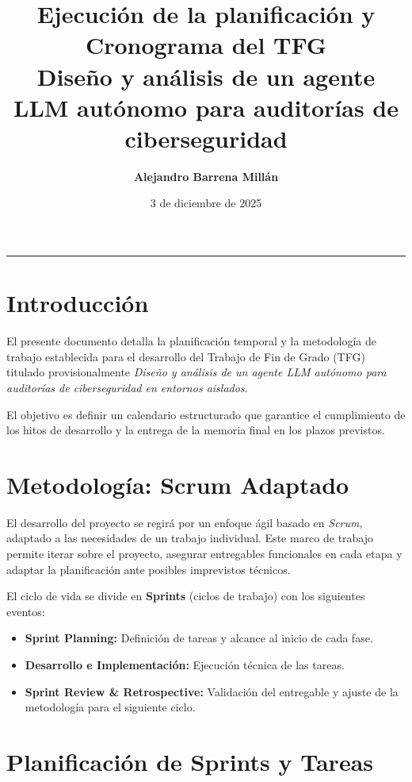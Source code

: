 \documentclass[12pt,a4paper]{article}
\title{
    \vspace{-2cm}
    \Large \textbf{Ejecución de la planificación y Cronograma del TFG}\\[10pt]
    \large Diseño y análisis de un agente LLM autónomo para auditorías de ciberseguridad
}
\author{\textbf{Alejandro Barrena Millán}}
\date{3 de diciembre de 2025}
\begin{document}
\maketitle
\thispagestyle{empty} 
\hrule
\vspace{1em}

\section{Introducción}

El presente documento detalla la planificación temporal y la metodología de trabajo establecida para el desarrollo del Trabajo de Fin de Grado (TFG) titulado provisionalmente \textit{Diseño y análisis de un agente LLM autónomo para auditorías de ciberseguridad en entornos aislados}.

El objetivo es definir un calendario estructurado que garantice el cumplimiento de los hitos de desarrollo y la entrega de la memoria final en los plazos previstos.

\section{Metodología: Scrum Adaptado}

El desarrollo del proyecto se regirá por un enfoque ágil basado en \textit{Scrum}, adaptado a las necesidades de un trabajo individual. Este marco de trabajo permite iterar sobre el proyecto, asegurar entregables funcionales en cada etapa y adaptar la planificación ante posibles imprevistos técnicos.

El ciclo de vida se divide en \textbf{Sprints} (ciclos de trabajo) con los siguientes eventos:
\begin{itemize}
    \item \textbf{Sprint Planning:} Definición de tareas y alcance al inicio de cada fase.
    \item \textbf{Desarrollo e Implementación:} Ejecución técnica de las tareas.
    \item \textbf{Sprint Review \& Retrospective:} Validación del entregable y ajuste de la metodología para el siguiente ciclo.
\end{itemize}

\section{Planificación de Sprints y Tareas}
\end{document}
